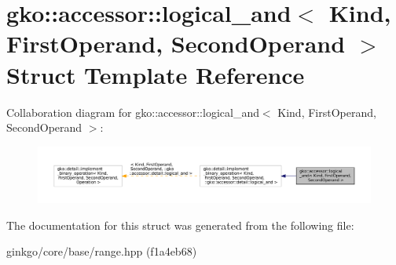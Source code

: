 \hypertarget{structgko_1_1accessor_1_1logical__and}{}\section{gko\+:\+:accessor\+:\+:logical\+\_\+and$<$ Kind, First\+Operand, Second\+Operand $>$ Struct Template Reference}
\label{structgko_1_1accessor_1_1logical__and}


Collaboration diagram for gko\+:\+:accessor\+:\+:logical\+\_\+and$<$ Kind, First\+Operand, Second\+Operand $>$\+:
\nopagebreak
\begin{figure}[H]
\begin{center}
\leavevmode
\includegraphics[width=350pt]{structgko_1_1accessor_1_1logical__and__coll__graph}
\end{center}
\end{figure}


The documentation for this struct was generated from the following file\+:\begin{DoxyCompactItemize}
\item 
ginkgo/core/base/range.\+hpp (f1a4eb68)\end{DoxyCompactItemize}
